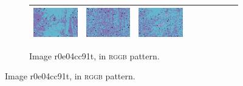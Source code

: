 \documentclass{ipol}
\begin{document}
\begin{figure}[ht]
\begin{subfigure}[t]{\linewidth}
\begin{tabular}{ccccccccc}
                \includegraphics[width=\s]{images/lake/LINEAR/bid_med_64_grids.png}&
                \includegraphics[width=\s]{images/lake/PPG/bid_med_64_grids.png}&
                \includegraphics[width=\s]{images/lake/VNG/bid_med_64_grids.png}\\
                \bottomrule
        \end{tabular}
                \caption{Image r0e04cc91t, in \textsc{rggb} pattern.}
\end{subfigure}


\end{figure}
\end{document}
